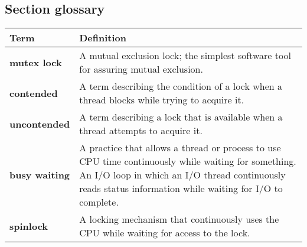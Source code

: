 \subsection*{Section glossary}
\centering
\begin{tabular}{>{\raggedright\arraybackslash}p{} >{\raggedright\arraybackslash}p{}}
\toprule
\textbf{Term} & \textbf{Definition} \\
\midrule
\textbf{mutex lock} & A mutual exclusion lock; the simplest software tool for assuring mutual exclusion. \\
\textbf{contended} & A term describing the condition of a lock when a thread blocks while trying to acquire it. \\
\textbf{uncontended} & A term describing a lock that is available when a thread attempts to acquire it. \\
\textbf{busy waiting} & A practice that allows a thread or process to use CPU time continuously while waiting for something. An I/O loop in which an I/O thread continuously reads status information while waiting for I/O to complete. \\
\textbf{spinlock} & A locking mechanism that continuously uses the CPU while waiting for access to the lock. \\
\bottomrule
\end{tabular}
\vspace{\baselineskip}
